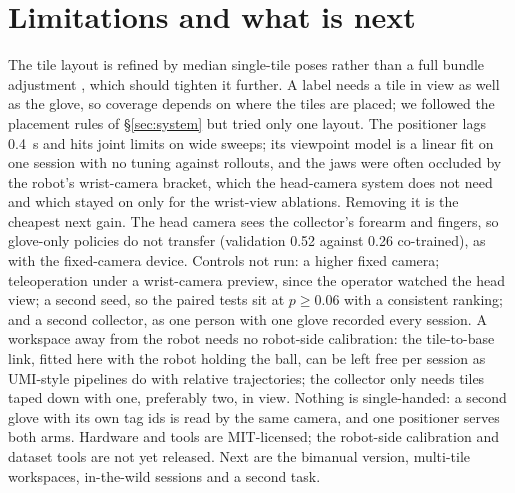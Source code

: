 \section{Limitations and what is next}
\label{sec:discussion}
The tile layout is refined by median single-tile poses rather than a full bundle adjustment \citep{triggs2000bundle}, which should tighten it further. A label needs a tile in view as well as the glove, so coverage depends on where the tiles are placed; we followed the placement rules of \S\ref{sec:system} but tried only one layout. The positioner lags \SI{0.4}{s} and hits joint limits on wide sweeps; its viewpoint model is a linear fit on one session with no tuning against rollouts, and the jaws were often occluded by the robot's wrist-camera bracket, which the head-camera system does not need and which stayed on only for the wrist-view ablations. Removing it is the cheapest next gain. The head camera sees the collector's forearm and fingers, so glove-only policies do not transfer (validation 0.52 against 0.26 co-trained), as with the fixed-camera device. Controls not run: a higher fixed camera; teleoperation under a wrist-camera preview, since the operator watched the head view; a second seed, so the paired tests sit at $p \geq 0.06$ with a consistent ranking; and a second collector, as one person with one glove recorded every session. A workspace away from the robot needs no robot-side calibration: the tile-to-base link, fitted here with the robot holding the ball, can be left free per session as UMI-style pipelines do with relative trajectories; the collector only needs tiles taped down with one, preferably two, in view. Nothing is single-handed: a second glove with its own tag ids is read by the same camera, and one positioner serves both arms. Hardware \citep{yamumi2026} and tools \citep{forwardcamumi2026} are MIT-licensed; the robot-side calibration and dataset tools are not yet released. Next are the bimanual version, multi-tile workspaces, in-the-wild sessions and a second task.
